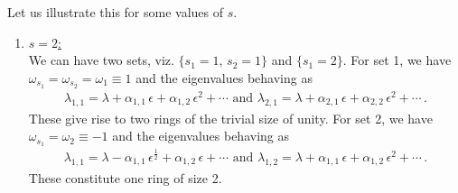 \documentclass[aps, prb, onecolumn, nofootinbib, citeautoscript, 10pt]{revtex4-2}
\begin{document}
Let us illustrate this for some values of $s$.
\begin{enumerate}

\item \underline{$s = 2$:}
\\We can have two sets, viz. $\lbrace s_1=1, \, s_2 = 1 \rbrace$ and $ \lbrace s_1= 2 \rbrace $. For set 1, we have $\omega_{s_1} = \omega_{s_2} = \omega_1 \equiv 1$ and the eigenvalues behaving as
\begin{align}
\lambda_{1, 1} = \lambda + \alpha_{1, 1}\, \epsilon
+ \alpha_{1, 2}\,\epsilon^2 + \cdots \text{ and }
\lambda_{2, 1} = \lambda + \alpha_{2, 1}\, \epsilon
+ \alpha_{2, 2}\,\epsilon^2 + \cdots \,.
\end{align}
These give rise to two rings of the trivial size of unity.
For set 2, we have $\omega_{s_1} =  \omega_2 \equiv -1 $ and the eigenvalues behaving as
\begin{align}
\lambda_{1, 1} = \lambda - \alpha_{1, 1}\,\epsilon^{\frac{1}{2}}
+ \alpha_{1, 2}\, \epsilon + \cdots \text{ and }
\lambda_{1, 2} = \lambda + \alpha_{1, 1} \,  \epsilon
+ \alpha_{1, 2} \, \epsilon^2 + \cdots \,.
\end{align}
These constitute one ring of size 2.
 

\end{enumerate}
\end{document}
